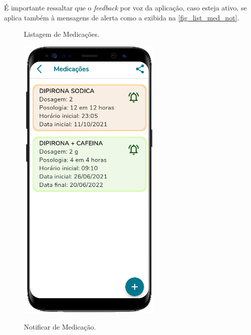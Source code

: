 É importante ressaltar que o \emph{feedback} por voz da aplicação, caso esteja ativo, se aplica também à
mensagens de alerta como a exibida na \autoref{fig_list_med_not}.

\begin{figure}[htb]
    \centering
    \begin{minipage}{0.45\textwidth}
        \centering
        \caption{Listagem de Medicações.}\label{fig_list_med}
        \includegraphics[scale=0.66]{Imagens/desenvolvimento/app/list_med.png}
    \end{minipage}
    \hfill
    \begin{minipage}{0.45\textwidth}
        \centering
        \caption{Notificar de Medicação.}\label{fig_list_med_not}

\end{minipage}
\end{figure}
